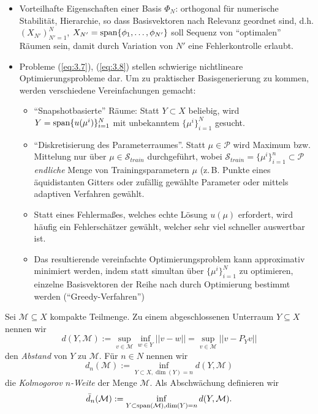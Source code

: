 \begin{itemize}
	\item Vorteilhafte Eigenschaften einer Basis $\Phi_N$: orthogonal für numerische Stabilität, Hierarchie, so dass Basisvektoren nach Relevanz geordnet sind, d.h. $(X_{N'})_{N'=1}^{N}$, $X_{N'} = \op{span}\{\phi_1, \dots, \phi_{N'}\}$ soll Sequenz von ``optimalen'' Räumen sein, damit durch Variation von $N'$ eine Fehlerkontrolle erlaubt.
	\item Probleme (\ref{eq:3.7}), (\ref{eq:3.8}) stellen schwierige nichtlineare Optimierungsprobleme dar. Um zu praktischer Basisgenerierung zu kommen, werden verschiedene Vereinfachungen gemacht:
	\begin{itemize}
		\item ``Snapshotbasierte'' Räume: Statt $Y \subset X$ beliebig, wird $Y = \operatorname{span}\{u(\mu^i)\}_{i=1}^N$ mit unbekanntem $\{\mu^i\}_{i=1}^N$ gesucht. 
		\item ``Diskretisierung des Parameterraumes''. Statt $\mu \in \mathcal{P}$ wird Maximum bzw. Mittelung nur über $\mu \in \mathcal{S}_{train}$ durchgeführt, wobei $\mathcal{S}_{train} = \{\mu^i\}_{i=1}^n \subset \mathcal{P}$ \emph{endliche} Menge von Trainingsparametern $\mu$ (z.\,B. Punkte eines äquidistanten Gitters oder zufällig gewählte Parameter oder mittels adaptiven Verfahren gewählt.
		\item Statt eines Fehlermaßes, welches echte Lösung $u(\mu)$ erfordert, wird häufig ein Fehlerschätzer gewählt, welcher sehr viel schneller auswertbar ist.
		\item Das resultierende vereinfachte Optimierungsproblem kann approximativ minimiert werden, indem statt simultan über $\{\mu^i\}_{i=1}^N$ zu optimieren, einzelne Basisvektoren der Reihe nach durch Optimierung bestimmt werden (``Greedy-Verfahren'')
	\end{itemize}
\end{itemize}

\begin{defn}
Sei $\mathcal{M} \subseteq X$ kompakte Teilmenge. Zu einem abgeschlossenen Unterraum $Y \subseteq X$ nennen wir
\[
	d(Y,\mathcal{M}) := \sup_{v \in \mathcal{M}} \inf_{w \in Y} ||v-w|| = \sup_{v \in \mathcal{M}} ||v-P_Yv||
\]
den \emph{Abstand} von $Y$ zu $\mathcal{M}$. Für $n \in N$ nennen wir
\[
	d_n(\mathcal{M}) := \inf_{Y \subset X , \dim(Y) = n} d(Y,\mathcal{M})
\]
die \emph{Kolmogorov $n$-Weite} der Menge $\mathcal{M}$. Als Abschwächung definieren wir
\[
	\bar{d}_n(\mathcal{M}) := \inf_{Y \subset \operatorname{span}(\mathcal{M}), \dim(Y)=n} d(Y,\mathcal{M}) .
\]
\end{defn}

